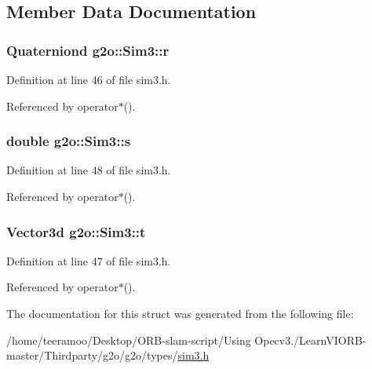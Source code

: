 \subsection{Member Data Documentation}
\subsubsection[{\texorpdfstring{r}{r}}]{\setlength{\rightskip}{0pt plus 5cm}Quaterniond g2o\+::\+Sim3\+::r\hspace{0.3cm}{\ttfamily [protected]}}\hypertarget{structg2o_1_1Sim3_a55dbe5c6ffe22526f20e05f0c23aa832}{}\label{structg2o_1_1Sim3_a55dbe5c6ffe22526f20e05f0c23aa832}


Definition at line 46 of file sim3.\+h.



Referenced by operator$\ast$().

\subsubsection[{\texorpdfstring{s}{s}}]{\setlength{\rightskip}{0pt plus 5cm}double g2o\+::\+Sim3\+::s\hspace{0.3cm}{\ttfamily [protected]}}\hypertarget{structg2o_1_1Sim3_a2cad7c49340494d4bdd28a497e4cb486}{}\label{structg2o_1_1Sim3_a2cad7c49340494d4bdd28a497e4cb486}


Definition at line 48 of file sim3.\+h.



Referenced by operator$\ast$().

\subsubsection[{\texorpdfstring{t}{t}}]{\setlength{\rightskip}{0pt plus 5cm}Vector3d g2o\+::\+Sim3\+::t\hspace{0.3cm}{\ttfamily [protected]}}\hypertarget{structg2o_1_1Sim3_a3ef879fb13b88732428bd2f2a558d11c}{}\label{structg2o_1_1Sim3_a3ef879fb13b88732428bd2f2a558d11c}


Definition at line 47 of file sim3.\+h.



Referenced by operator$\ast$().



The documentation for this struct was generated from the following file\+:\begin{DoxyCompactItemize}
\item 
/home/teeramoo/\+Desktop/\+O\+R\+B-\/slam-\/script/\+Using Opecv3./\+Learn\+V\+I\+O\+R\+B-\/master/\+Thirdparty/g2o/g2o/types/\hyperlink{sim3_8h}{sim3.\+h}\end{DoxyCompactItemize}
